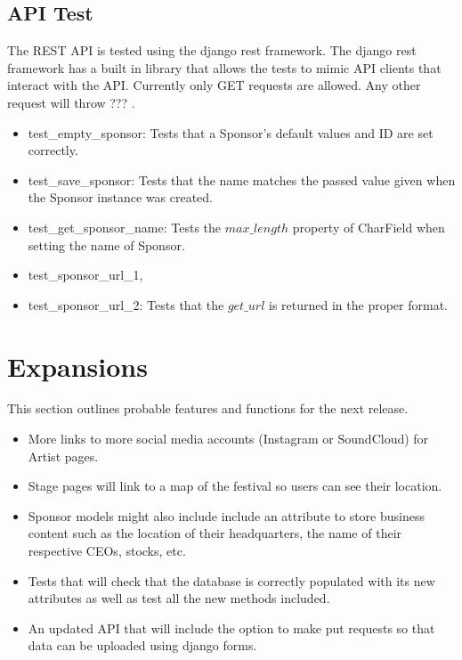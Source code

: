 \documentclass[12pt,english]{scrartcl}
\begin{document}
\subsection{API Test} 
The REST API is tested using the django rest framework. The django rest framework has a built in library that allows the tests to mimic API clients that interact with the API.
Currently only GET requests are allowed. Any other request will throw ??? .
\begin{itemize}
\item test\_empty\_sponsor: Tests that a Sponsor's default values and ID are set correctly.
 
\item test\_save\_sponsor: Tests that the name matches the passed value given when the Sponsor instance was created.  
 
\item test\_get\_sponsor\_name: Tests the $max\_length$ property of CharField when setting the name of Sponsor.

\item test\_sponsor\_url\_1, \item test\_sponsor\_url\_2: Tests that the $get\_url$ is returned in the proper format.
\end{itemize}

\section{Expansions}
This section outlines probable features and functions for the next release.
\begin{itemize}

\item More links to more social media accounts (Instagram or SoundCloud) for Artist pages.

\item Stage pages will link to a map of the festival so users can see their location.

\item Sponsor models might also include include an attribute to store business content such as the location of their headquarters, the name of their respective CEOs, stocks, etc.

\item  Tests that will check that the database is correctly populated with its new attributes as well as test all the new methods included.

\item An updated API that will include the option to make put requests so that data can be uploaded using django forms.
\end{itemize}
\end{document}
